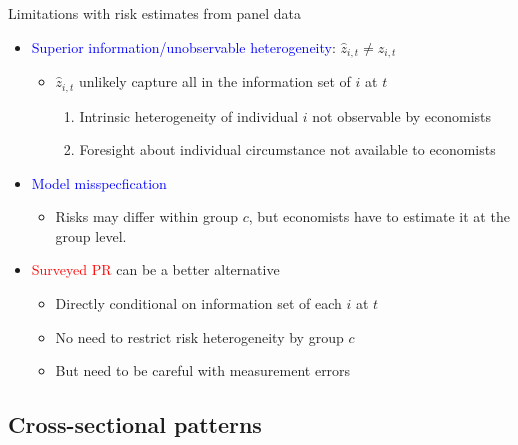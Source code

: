 \documentclass{beamer}
\begin{document}
\begin{frame}{Limitations with risk estimates from panel data}
	\begin{itemize}
		\item \textcolor{blue}{Superior information/unobservable heterogeneity}: $\hat z_{i,t} \neq z_{i,t}$ 
		\begin{itemize}
			\item $\hat z_{i,t}$ unlikely capture all in the information set of $i$ at $t$
			\begin{enumerate}
				\item Intrinsic heterogeneity of individual $i$ not observable by economists 
				\item Foresight about individual circumstance not available to economists
			\end{enumerate}
		\end{itemize}
		\pause
		\item \textcolor{blue}{Model misspecfication}
		\begin{itemize}
			\item Risks may differ within group $c$, but economists have to estimate it at the group level.
		\end{itemize}
		\pause
		\item \textcolor{red}{Surveyed PR} can be a better alternative 
		\begin{itemize}
			\item Directly conditional on information set of each $i$ at $t$
			\item No need to restrict risk heterogeneity by group $c$
			\item But need to be careful with measurement errors 
		\end{itemize}
	\end{itemize}	
\end{frame}


\subsection{Cross-sectional patterns}

\end{document}

